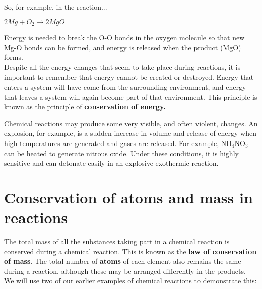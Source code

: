 So, for example, in the reaction...

\begin{center}
\rm${2Mg + O_{2} \rightarrow 2MgO}$\\
\end{center}

Energy is needed to break the O-O bonds in the oxygen molecule so that new Mg-O bonds can be formed, and energy is released when the product (MgO) forms. \\

Despite all the energy changes that seem to take place during reactions, it is important to remember that energy cannot be created or destroyed. Energy that enters a system will have come from the surrounding environment, and energy that leaves a system will again become part of that environment. This principle is known as the principle of \textbf{conservation of energy.}


Chemical reactions may produce some very visible, and often violent, changes. An explosion, for example, is a sudden increase in volume and release of energy when high temperatures are generated and gases are released. For example, NH$_{4}$NO$_{3}$ can be heated to generate nitrous oxide. Under these conditions, it is highly sensitive and can detonate easily in an explosive exothermic reaction.







\section{Conservation of atoms and mass in reactions}

The total mass of all the substances taking part in a chemical reaction is conserved during a chemical reaction. This is known as the \textbf{law of conservation of mass}. The total number of \textbf{atoms} of each element also remains the same during a reaction, although these may be arranged differently in the products.\\

We will use two of our earlier examples of chemical reactions to demonstrate this:

